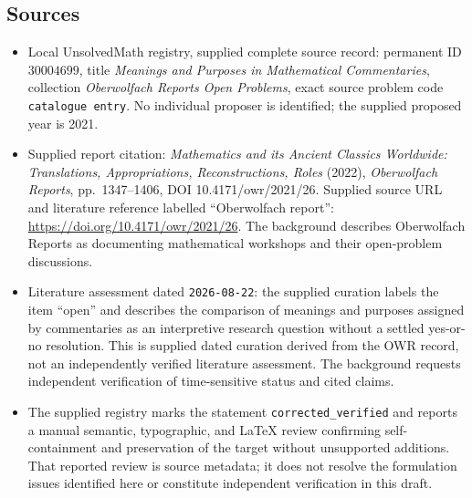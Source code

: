 \documentclass[11pt]{article}
\begin{document}
\subsection{Sources}
\begin{itemize}
\item Local UnsolvedMath registry, supplied complete source record: permanent ID \(30004699\), title \emph{Meanings and Purposes in Mathematical Commentaries}, collection \emph{Oberwolfach Reports Open Problems}, exact source problem code \texttt{catalogue entry}. No individual proposer is identified; the supplied proposed year is 2021.
\item Supplied report citation: \emph{Mathematics and its Ancient Classics Worldwide: Translations, Appropriations, Reconstructions, Roles} (2022), \emph{Oberwolfach Reports}, pp.\ 1347--1406, DOI 10.4171/owr/2021/26. Supplied source URL and literature reference labelled ``Oberwolfach report'': \url{https://doi.org/10.4171/owr/2021/26}. The background describes Oberwolfach Reports as documenting mathematical workshops and their open-problem discussions.
\item Literature assessment dated \texttt{2026-08-22}: the supplied curation labels the item ``open'' and describes the comparison of meanings and purposes assigned by commentaries as an interpretive research question without a settled yes-or-no resolution. This is supplied dated curation derived from the OWR record, not an independently verified literature assessment. The background requests independent verification of time-sensitive status and cited claims.
\item The supplied registry marks the statement \texttt{corrected\_verified} and reports a manual semantic, typographic, and LaTeX review confirming self-containment and preservation of the target without unsupported additions. That reported review is source metadata; it does not resolve the formulation issues identified here or constitute independent verification in this draft.
\end{itemize}
\end{document}
